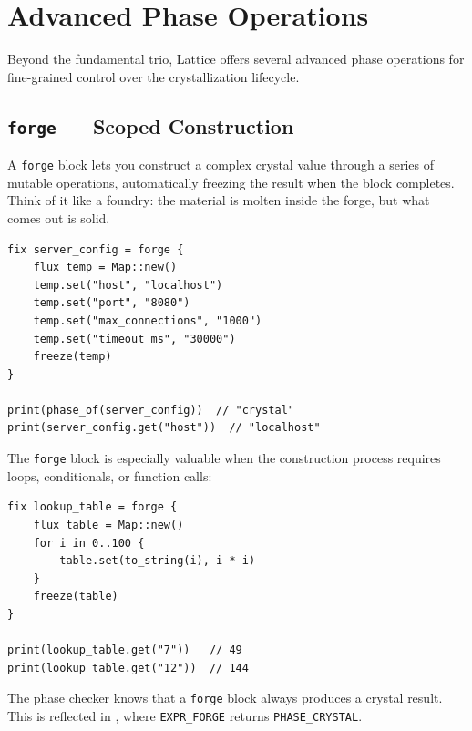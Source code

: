 
\section{Advanced Phase Operations}\label{sec:advanced-phase-ops}

Beyond the fundamental trio, Lattice offers several advanced phase operations for fine-grained control over the crystallization lifecycle.

\subsection{\texttt{forge} --- Scoped Construction}\label{subsec:forge}


A \lstinline|forge| block lets you construct a complex crystal value through a series of mutable operations, automatically freezing the result when the block completes.
Think of it like a foundry: the material is molten inside the forge, but what comes out is solid.

\begin{lstlisting}[language=Lattice, caption={Building a crystal value with \texttt{forge}}]
fix server_config = forge {
    flux temp = Map::new()
    temp.set("host", "localhost")
    temp.set("port", "8080")
    temp.set("max_connections", "1000")
    temp.set("timeout_ms", "30000")
    freeze(temp)
}

print(phase_of(server_config))  // "crystal"
print(server_config.get("host"))  // "localhost"
\end{lstlisting}

The \lstinline|forge| block is especially valuable when the construction process requires loops, conditionals, or function calls:

\begin{lstlisting}[language=Lattice, caption={Complex construction inside \texttt{forge}}]
fix lookup_table = forge {
    flux table = Map::new()
    for i in 0..100 {
        table.set(to_string(i), i * i)
    }
    freeze(table)
}

print(lookup_table.get("7"))   // 49
print(lookup_table.get("12"))  // 144
\end{lstlisting}

The phase checker knows that a \lstinline|forge| block always produces a crystal result.
This is reflected in , where \lstinline|EXPR_FORGE| returns \lstinline|PHASE_CRYSTAL|.

